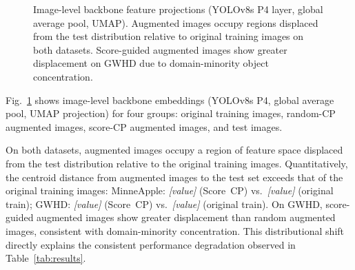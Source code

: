 \documentclass[conference]{IEEEtran}
\begin{document}
\begin{figure}[t]
\centering
\caption{Image-level backbone feature projections (YOLOv8s P4 layer,
  global average pool, UMAP). Augmented images occupy regions
  displaced from the test distribution relative to original training
  images on both datasets. Score-guided augmented images show greater
  displacement on GWHD due to domain-minority object concentration.}
\label{fig:feature_space}
\end{figure}

Fig.~\ref{fig:feature_space} shows image-level backbone embeddings
(YOLOv8s P4, global average pool, UMAP projection) for four groups:
original training images, random-CP augmented images, score-CP
augmented images, and test images.

On both datasets, augmented images occupy a region of feature space
displaced from the test distribution relative to the original training
images. Quantitatively, the centroid distance from augmented images to
the test set exceeds that of the original training images:
MinneApple: \textit{[value]} (Score~CP) vs.\ \textit{[value]}
(original train);
GWHD: \textit{[value]} (Score~CP) vs.\ \textit{[value]}
(original train).
On GWHD, score-guided augmented images show greater displacement than
random augmented images, consistent with domain-minority concentration.
This distributional shift directly explains the consistent performance
degradation observed in Table~\ref{tab:results}.
\end{document}
